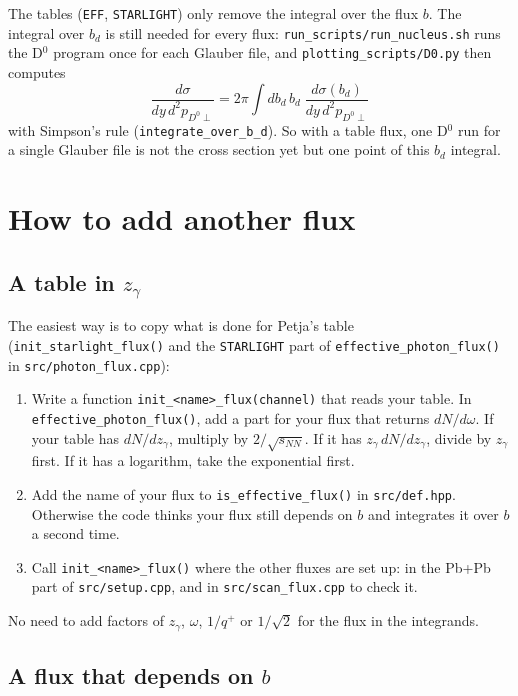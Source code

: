 \documentclass{article}
\begin{document}
The tables (\texttt{EFF}, \texttt{STARLIGHT}) only remove the integral over the
flux $b$. The integral over $b_d$ is still needed for every flux:
\texttt{run\_scripts/run\_nucleus.sh} runs the D$^0$ program once for each
Glauber file, and \texttt{plotting\_scripts/D0.py} then computes
\begin{equation}
  \frac{d\sigma}{dy\,d^2p_{D^0\perp}} = 2\pi \int db_d\, b_d\;
  \frac{d\sigma(b_d)}{dy\,d^2p_{D^0\perp}}
\end{equation}
with Simpson's rule (\texttt{integrate\_over\_b\_d}). So with a table flux, one D$^0$
run for a single Glauber file is not the cross section yet but one
point of this $b_d$ integral. 

\section{How to add another flux}\label{sec:own}

\subsection{A table in $z_\gamma$}

The easiest
way is to copy what is done for Petja's table
(\texttt{init\_starlight\_flux()} and the \texttt{STARLIGHT} part of
\texttt{effective\_photon\_flux()} in \texttt{src/photon\_flux.cpp}):
\begin{enumerate}
\item Write a function \texttt{init\_<name>\_flux(channel)} that reads your
  table. In \texttt{effective\_photon\_flux()}, add a part for your flux that
  returns \textbf{$dN/d\omega$}. If your table has $dN/dz_\gamma$, multiply by
  $2/\sqrt{s_{NN}}$. If it has $z_\gamma\,dN/dz_\gamma$, divide by $z_\gamma$ first. If it has a
  logarithm, take the exponential first.
\item Add the name of your flux to \texttt{is\_effective\_flux()} in
  \texttt{src/def.hpp}. Otherwise the code thinks your flux still depends on
  $b$ and integrates it over $b$ a second time.
\item Call \texttt{init\_<name>\_flux()} where the other fluxes are set up:
  in the Pb+Pb part of \texttt{src/setup.cpp}, and in
  \texttt{src/scan\_flux.cpp} to check it.
\end{enumerate}
No need to add factors of $z_\gamma$, $\omega$, $1/q^+$ or $1/\sqrt2$ for the flux in the
integrands.


\subsection{A flux that depends on $b$}
\end{document}
